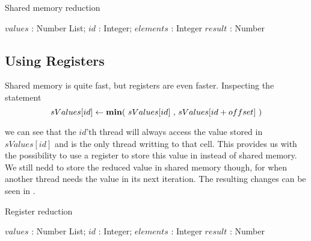 \begin{algorithm}
  \caption{Shared memory reduction}
  \label{alg:sharedReduct}
  \begin{algorithmic}
              {$values$ : Number List; $id$ : Integer; $elements$ : Integer}
              {$result$ : Number}
              {
                \SYNC
                  \ENDIF
                  \SYNC
                \ENDWHILE
                \ENDIF
              }
  \end{algorithmic}
\end{algorithm}

\subsection{Using Registers}

Shared memory is quite fast, but registers are even faster. Inspecting
the statement 
\begin{displaymath}
  sValues[id] \leftarrow \text{\textbf{min}$($ $sValues[id]$ , $sValues[id + offset]$ $)$}
\end{displaymath}

we can see that the $id$'th thread will always access the value stored in
$sValues[id]$ and is the only thread writting to that cell. This provides us
with the possibility to use a register to store this value in instead of shared
memory. We still nedd to store the reduced value in shared memory though, for
when another thread needs the value in its next iteration. The resulting changes
can be seen in .

\begin{algorithm}
  \caption{Register reduction}
  \label{alg:registerReduct}
  \begin{algorithmic}
              {$values$ : Number List; $id$ : Integer; $elements$ : Integer}
              {$result$ : Number}
              {
                \SYNC
                  \ENDIF
                  \SYNC
                \ENDWHILE
                \ENDIF
              }
  \end{algorithmic}
\end{algorithm}



